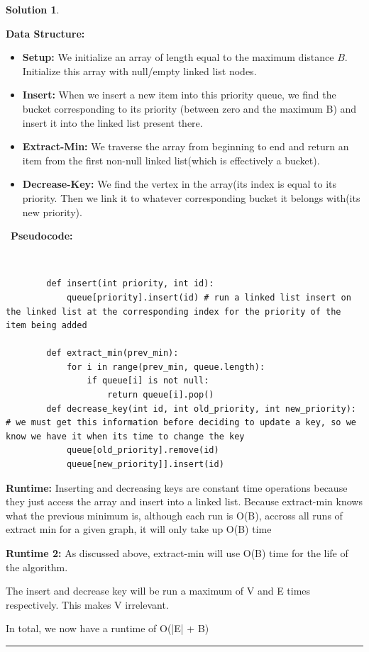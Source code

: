 \documentclass{article}
\theoremstyle{definition}
\def\fline{\rule{0.75\linewidth}{0.5pt}}
\newcommand{\finishline}{\begin{center}\fline\end{center}}
\newtheorem*{solution*}{Solution}
\newenvironment{solution}{\begin{solution*}}{{\finishline} \end{solution*}}
\begin{document}
\begin{solution}

    \

    \textbf{Data Structure: }

    \begin{itemize}
        \item \textbf{Setup:} We initialize an array of length equal to the maximum distance $B$. Initialize this array with null/empty linked list nodes.
        \item \textbf{Insert:} When we insert a new item into this priority queue, we find the bucket corresponding to its priority (between zero and the maximum B) and insert it into the linked list present there.
        \item \textbf{Extract-Min: } We traverse the array from beginning to end and return an item from the first non-null linked list(which is effectively a bucket).
        \item \textbf{Decrease-Key:} We find the vertex in the array(its index is equal to its priority. Then we link it to whatever corresponding bucket it belongs with(its new priority). 
    \end{itemize}

    \
    \textbf{Pseudocode: }

    \
    \begin{verbatim}
        def insert(int priority, int id):
            queue[priority].insert(id) # run a linked list insert on the linked list at the corresponding index for the priority of the item being added

        def extract_min(prev_min):
            for i in range(prev_min, queue.length):
                if queue[i] is not null:
                    return queue[i].pop()
        def decrease_key(int id, int old_priority, int new_priority): # we must get this information before deciding to update a key, so we know we have it when its time to change the key
            queue[old_priority].remove(id)
            queue[new_priority]].insert(id)

    \end{verbatim}

    \textbf{Runtime: }
        Inserting and decreasing keys are constant time operations because they just access the array and insert into a linked list. 
        Because extract-min knows what the previous minimum is, although each run is O(B), accross all runs of extract min for a given graph, it will only take up O(B) time
    \

    \textbf{Runtime 2: }
        As discussed above, extract-min will use O(B) time for the life of the algorithm.

        The insert and decrease key will be run a maximum of V and E times respectively. This makes V irrelevant.

        In total, we now have a runtime of O(|E| + B)
\end{solution}
\end{document}
